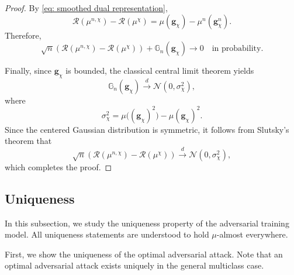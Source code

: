 \documentclass{amsart}
\theoremstyle{plain}
\numberwithin{equation}{section}\newtheorem{theorem}{Theorem}[section]
\theoremstyle{remark}
\begin{document}
\begin{proof}
By \eqref{eq: smoothed dual representation},
\[
    \mathscr R(\mu^{n,\chi})-\mathscr R(\mu^\chi)
    = \mu(\bm g_\chi) - \mu^n(\bm g_\chi^n).
\]
Therefore,
\[
    \sqrt n
    \left(
        \mathscr R(\mu^{n,\chi})
        -
        \mathscr R(\mu^\chi)
    \right)
    +
    \mathbb G_n(\bm g_\chi)
    \longrightarrow0 \quad \text{in probability}.
\]


Finally, since $\bm g_\chi$ is bounded, the classical central limit
theorem yields
\[
    \mathbb G_n(\bm g_\chi)
    \overset{d}{\longrightarrow}
    \mathcal N(0,\sigma_\chi^2),
\]
where
\[
    \sigma_\chi^2
    =
    \mu\bigl((\bm g_\chi)^2\bigr)
    -
    \mu(\bm g_\chi)^2.
\]
Since the centered Gaussian distribution is symmetric, it follows from Slutsky's theorem that
\[
    \sqrt n
    \left(
        \mathscr R(\mu^{n,\chi})
        -
        \mathscr R(\mu^\chi)
    \right)
    \overset{d}{\longrightarrow}
    \mathcal N(0,\sigma_\chi^2),
\]
which completes the proof.
\end{proof}







\subsection{Uniqueness}\label{subsection: uniqueness}

In this subsection, we study the uniqueness property of the adversarial training model. All uniqueness statements are understood to hold $\mu$-almost everywhere.




First, we show the uniqueness of the optimal adversarial attack. Note that an optimal adversarial attack exists uniquely in the general multiclass case.
\end{document}

